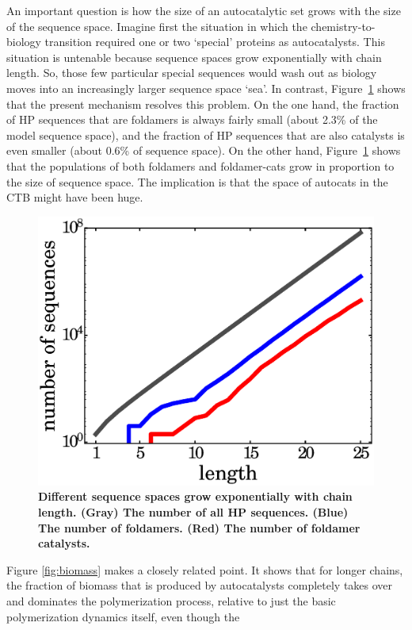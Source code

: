 \documentclass[twocolumn,letterpaper]{revtex4-1}
\begin{document}
 An important question is how the size of an autocatalytic set grows with the size of the sequence 
space.  Imagine first the situation in which the chemistry-to-biology transition required one or 
two `special' proteins as autocatalysts.  This situation is untenable because sequence spaces grow 
exponentially with chain length.  So, those few particular special sequences would wash out as 
biology moves into an increasingly larger sequence space `sea'.  In contrast, 
Figure~\ref{fig:hp-statistics} shows that the present mechanism resolves this problem.  On the one 
hand, the fraction of HP sequences that are foldamers is always fairly small (about 2.3\% of the 
model sequence space), and the fraction of HP sequences that are also catalysts is even smaller 
(about 0.6\% of sequence space).  On the other hand, Figure~\ref{fig:hp-statistics} shows that the 
populations of both foldamers and foldamer-cats grow in proportion to the size of sequence space.  
The implication is that the space of autocats in the CTB might have been huge.
\begin{figure}[hbt!]
  \centering
  \includegraphics[width=0.9\columnwidth]{pictures/hp-statistics.eps} 
  \caption{\footnotesize{\bf{Different sequence spaces grow exponentially with chain length.}  
(Gray) The number of all HP sequences.  (Blue) The number of foldamers.  (Red) The number of 
foldamer catalysts.}}
  \label{fig:hp-statistics}
\end{figure}
 Figure \ref{fig:biomass} makes a closely related point.  It shows that for longer chains, the 
fraction of biomass that is produced by autocatalysts completely takes over and dominates the 
polymerization process, relative to just the basic polymerization dynamics itself, even though the 
\end{document}
